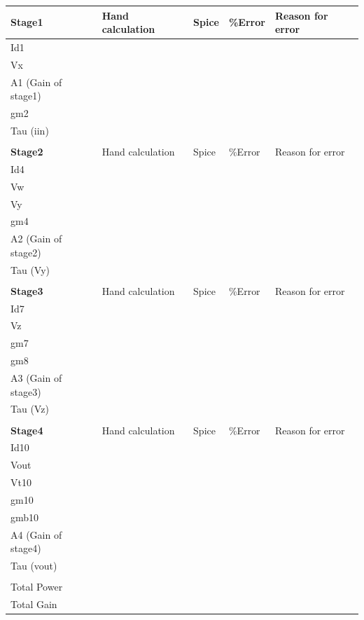 \documentclass[12pt,a4paper]{article}
\begin{document}
\begin{table}[h]
\centering
\begin{tabular}{|l|l|l|l|l|}
\hline
\textbf{Stage1} & Hand calculation & Spice & \%Error & Reason for 
error \\
\hline
Id1 &   &   &   &   \\
\hline
Vx &   &   &   &   \\
\hline
A1 (Gain of stage1) &   &   &   &   \\
\hline
gm2 &   &   &   &   \\
\hline
Tau (iin) &   &   &   &   \\
\hline
  &   &   &   &   \\
\hline
\textbf{Stage2} & Hand calculation & Spice & \%Error & Reason for 
error \\
\hline
Id4 &   &   &   &   \\
\hline
Vw &   &   &   &   \\
\hline
Vy &   &   &   &   \\
\hline
gm4 &   &   &   &   \\
\hline
A2 (Gain of stage2) &   &   &   &   \\
\hline
Tau (Vy) &   &   &   &   \\
\hline
  &   &   &   &   \\
\hline
\textbf{Stage3} & Hand calculation & Spice & \%Error & Reason for 
error \\
\hline
Id7 &   &   &   &   \\
\hline
Vz &   &   &   &   \\
\hline
gm7 &   &   &   &   \\
\hline
gm8 &   &   &   &   \\
\hline
A3 (Gain of stage3) &   &   &   &   \\
\hline
Tau (Vz) &   &   &   &   \\
\hline
  &   &   &   &   \\
\hline
\textbf{Stage4} & Hand calculation & Spice & \%Error & Reason for 
error \\
\hline
Id10 &   &   &   &   \\
\hline
Vout &   &   &   &   \\
\hline
Vt10 &   &   &   &   \\
\hline
gm10 &   &   &   &   \\
\hline
gmb10 &   &   &   &   \\
\hline
A4 (Gain of stage4) &   &   &   &   \\
\hline
Tau (vout) &   &   &   &   \\
\hline
  &   &   &   &   \\
\hline
Total Power &   &   &   &   \\
\hline
Total Gain &   &   &   &   \\
\hline
\end{tabular}
\end{table}
\end{document}
